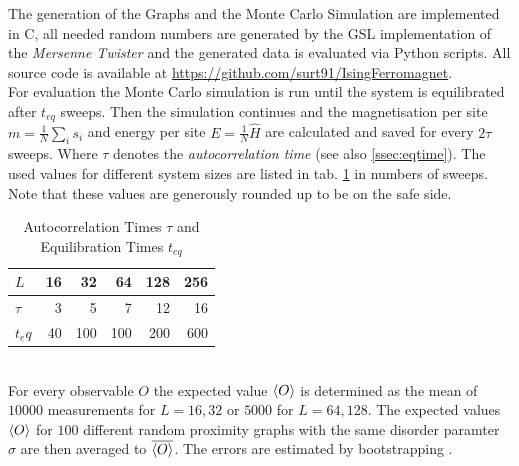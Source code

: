 The generation of the Graphs and the Monte Carlo Simulation are implemented
in C, all needed random numbers are generated by the GSL \cite{GSL}
implementation of the \emph{Mersenne Twister} \cite{Matsumoto1998} and
the generated data is evaluated via Python scripts.
All source code is available at \url{https://github.com/surt91/IsingFerromagnet}.\\

For evaluation the Monte Carlo simulation is run until the system
is equilibrated after \(t_{eq}\) sweeps. Then the simulation continues
and the magnetisation per site \(m=\frac{1}{N}\sum_i s_i\) and energy
per site \(E=\frac{1}{N}\hat H\) are calculated and saved for every
\(2\tau\) sweeps. Where \(\tau\) denotes the \emph{autocorrelation time}
(see also \ref{ssec:eqtime}). The used values for different system sizes
are listed in tab. \ref{tab:tauAndTeq} in numbers of sweeps. Note that
these values are generously rounded up to be on the safe side.
\begin{table}[htbp]
    \center
    \begin{tabular}{l r r r r r}
        \toprule
        \(L\)    & 16 &  32 &  64 & 128 & 256\\
        \midrule
        \(\tau\) &  3 &   5 &   7 &  12 &  16\\
        \(t_eq\) & 40 & 100 & 100 & 200 & 600\\
        \bottomrule
    \end{tabular}
    \caption{Autocorrelation Times $\tau$ and Equilibration Times $t_{eq}$}
    \label{tab:tauAndTeq}
\end{table}\\
For every observable \(O\) the expected value \(\left< O \right>\) is determined
as the mean of \(10000\) measurements for \(L=16,32\) or \(5000\) for
\(L=64,128\). The expected values \(\left< O \right>\) for \(100\) different
random proximity graphs with the same disorder paramter \(\sigma\)
are then averaged to \(\overline{\left< O \right>}\). The errors are estimated
by bootstrapping \cite{Bootstrap}.

